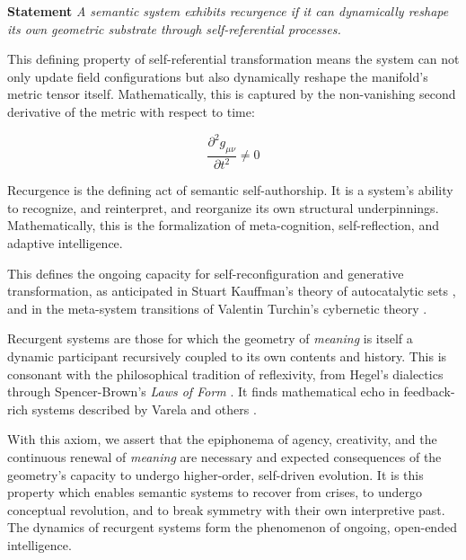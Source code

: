 \textbf{Statement} \textit{A semantic system exhibits recurgence if it can dynamically reshape its own geometric substrate through self-referential processes.}

This defining property of self-referential transformation means the system can not only update field configurations but also dynamically reshape the manifold's metric tensor itself. Mathematically, this is captured by the non-vanishing second derivative of the metric with respect to time:

\begin{equation}
\frac{\partial^2 g_{\mu\nu}}{\partial t^2} \neq 0
\end{equation} 

Recurgence is the defining act of semantic self-authorship. It is a system's ability to recognize, and reinterpret, and reorganize its own structural underpinnings. Mathematically, this is the formalization of meta-cognition, self-reflection, and adaptive intelligence.

This defines the ongoing capacity for self-reconfiguration and generative transformation, as anticipated in Stuart Kauffman's theory of autocatalytic sets \autocite{Kauffman1993}, and in the meta-system transitions of Valentin Turchin's cybernetic theory \autocite{Turchin1977}.

Recurgent systems are those for which the geometry of \textit{meaning} is itself a dynamic participant recursively coupled to its own contents and history. This is consonant with the philosophical tradition of reflexivity, from Hegel's dialectics \autocite{Hegel1807} through Spencer-Brown's \textit{Laws of Form} \autocite{SpencerBrown1969}. It finds mathematical echo in feedback-rich systems described by Varela and others \autocite{Varela1979, Rosen1991}.

With this axiom, we assert that the epiphonema of agency, creativity, and the continuous renewal of \textit{meaning} are necessary and expected consequences of the geometry's capacity to undergo higher-order, self-driven evolution. It is this property which enables semantic systems to recover from crises, to undergo conceptual revolution, and to break symmetry with their own interpretive past. The dynamics of recurgent systems form the phenomenon of ongoing, open-ended intelligence.
